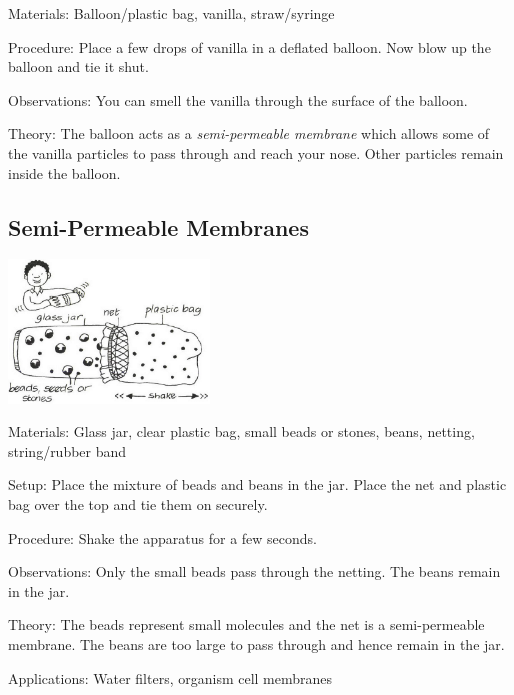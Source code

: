 \begin{multicols}{2}
\begin{description*}
\item[Materials:]{Balloon/plastic bag, vanilla, straw/syringe}
\item[Procedure:]{Place a few drops of vanilla in a deflated balloon. Now blow up the balloon and tie it shut.}
\item[Observations:]{You can smell the vanilla through the surface of the balloon.}
\item[Theory:]{The balloon acts as a \emph{semi-permeable membrane} which allows some of the vanilla particles to pass through and reach your nose. Other particles remain inside the balloon.}
\end{description*}

\subsection{Semi-Permeable Membranes}

\begin{center}
\includegraphics[width=0.4\textwidth]{./img/vso/membrane.png}
\end{center}

\begin{description*}
\item[Materials:]{Glass jar, clear plastic bag, small beads or stones, beans, netting, string/rubber band}
\item[Setup:]{Place the mixture of beads and beans in the jar. Place the net and plastic bag over the top and tie them on securely.}
\item[Procedure:]{Shake the apparatus for a few seconds.}
\item[Observations:]{Only the small beads pass through the netting. The beans remain in the jar.}
\item[Theory:]{The beads represent small molecules and the net is a semi-permeable membrane. The beans are too large to pass through and hence remain in the jar.}
\item[Applications:]{Water filters, organism cell membranes}
\end{description*}



\end{multicols}
